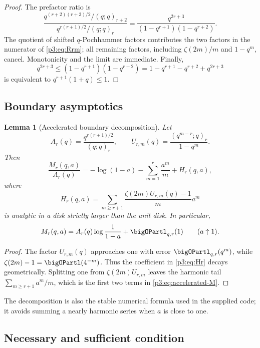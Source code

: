 \documentclass[11pt]{article}
\numberwithin{equation}{section}
\newtheorem{lemma}[theorem]{Lemma}
\theoremstyle{definition}
\theoremstyle{remark}
\begin{document}
\begin{proof}
The prefactor ratio is
\[
 \frac{q^{(r+2)(r+3)/2}/(q;q)_{r+2}}
      {q^{r(r+1)/2}/(q;q)_r}
 =\frac{q^{2r+3}}{(1-q^{r+1})(1-q^{r+2})}.
\]
The quotient of shifted $q$-Pochhammer factors contributes the two factors in the numerator
of \eqref{p3:eq:Rrm}; all remaining factors, including $\zeta(2m)/m$ and $1-q^m$, cancel.
Monotonicity and the limit are immediate.  Finally,
\[
 q^{2r+3}\le(1-q^{r+1})(1-q^{r+2})
 =1-q^{r+1}-q^{r+2}+q^{2r+3}
\]
is equivalent to $q^{r+1}(1+q)\le1$.
\end{proof}

\subsection{Boundary asymptotics}

\begin{lemma}[Accelerated boundary decomposition]\label{p3:lem:boundary-decomp}
Let
\[
 A_r(q)=\frac{q^{r(r+1)/2}}{(q;q)_r},\qquad
 U_{r,m}(q)=\frac{(q^{m-r};q)_r}{1-q^m}.
\]
Then
\begin{equation}
 \frac{M_r(q,a)}{A_r(q)}
 =-\log(1-a)-\sum_{m=1}^{r}\frac{a^m}{m}
 +H_r(q,a),
 \label{p3:eq:accelerated-M}
\end{equation}
where
\begin{equation}
 H_r(q,a)=\sum_{m\ge r+1}
 \frac{\zeta(2m)U_{r,m}(q)-1}{m}a^m
 \label{p3:eq:Hr}
\end{equation}
is analytic in a disk strictly larger than the unit disk.  In particular,
\begin{equation}
 M_r(q,a)=A_r(q)\log\frac1{1-a}+\bigOPartl_{q,r}(1)
 \qquad(a\uparrow1).
 \label{p3:eq:Mr-boundary}
\end{equation}
\end{lemma}

\begin{proof}
The factor $U_{r,m}(q)$ approaches one with error $\bigOPartl_{q,r}(q^m)$, while
$\zeta(2m)-1=\bigOPartl(4^{-m})$.  Thus the coefficient in \eqref{p3:eq:Hr} decays
geometrically.  Splitting one from $\zeta(2m)U_{r,m}$ leaves the harmonic tail
$\sum_{m\ge r+1}a^m/m$, which is the first two terms in \eqref{p3:eq:accelerated-M}.
\end{proof}

The decomposition is also the stable numerical formula used in the supplied code; it avoids
summing a nearly harmonic series when $a$ is close to one.

\subsection{Necessary and sufficient condition}
\end{document}
